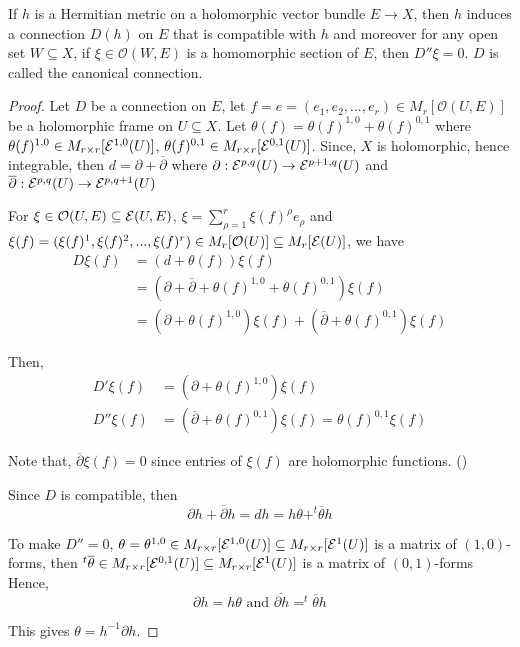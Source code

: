 \begin{theorem}
	If $h$ is a Hermitian metric on a holomorphic vector bundle $E \to X$, then $h$ induces a connection $D(h)$ on $E$ that is compatible with $h$ and moreover for any open set $W \subseteq X$, if $\xi \in \mathcal{O}(W, E)$ is a homomorphic section of $E$, then $D'' \xi = 0$. $D$ is called the canonical connection.
	\begin{proof}
		Let $D$ be a connection on $E$, let $f = e = (e_1, e_2, ..., e_r) \in M_{r}[\mathcal{O}(U, E)]$ be a holomorphic frame on $U \subseteq X$. Let $\theta(f) = \theta(f)^{1,0} +  \theta(f)^{0, 1}$ where $\theta(f)^{1,0} \in M_{r \times r}[\mathcal{E}^{1, 0}(U)]$, $\theta(f)^{0,1} \in M_{r \times r}[\mathcal{E}^{0,1}(U)]$. Since, $X$ is holomorphic, hence integrable, then $d = \partial + \overline{\partial}$ where $\partial: \mathcal{E}^{p, q}(U) \to \mathcal{E}^{p+1, q}(U)$ and  $\overline{\partial}: \mathcal{E}^{p, q}(U) \to \mathcal{E}^{p, q+1}(U)$
		
		 For $\xi \in \mathcal{O}(U, E) \subseteq \mathcal{E}(U, E)$, $\xi = \sum_{\rho=1}^r \xi(f)^\rho e_\rho$ and $\xi(f) = (\xi(f)^1, \xi(f)^2, ..., \xi(f)^r) \in M_r[\mathcal{O}(U)] \subseteq M_r[\mathcal{E}(U)]$, we have
		\begin{align*}
			D \xi(f)
			&= (d + \theta(f)) \xi(f) \\
			&= (\partial + \overline{\partial} + \theta(f)^{1,0} +  \theta(f)^{0, 1}) \xi(f) \\
			&= (\partial + \theta(f)^{1,0}) \xi(f) + (\overline{\partial} + \theta(f)^{0, 1}) \xi(f)
		\end{align*}
		
		Then, 
		\begin{align*}
			D' \xi(f) &= (\partial + \theta(f)^{1,0}) \xi(f) \\
			D'' \xi(f) &= (\overline{\partial} + \theta(f)^{0, 1}) \xi(f) = \theta(f)^{0, 1} \xi(f)
		\end{align*}
		
		Note that, $\overline{\partial} \xi(f) = 0$ since entries of $\xi(f)$ are holomorphic functions. () 
		
		Since $D$ is compatible, then
		$$
			\partial h + \overline{\partial} h = dh = h\theta + ^t\overline{\theta} h
		$$
		
		To make $D'' = 0$, $\theta = \theta^{1, 0} \in M_{r \times r}[\mathcal{E}^{1, 0}(U)] \subseteq M_{r \times r}[\mathcal{E}^1(U)]$ is a matrix of $(1, 0)$-forms, then $^t\overline{\theta} \in M_{r \times r}[\mathcal{E}^{0, 1}(U)] \subseteq M_{r \times r}[\mathcal{E}^1(U)]$ is a matrix of $(0, 1)$-forms
		Hence,
		$$
			\partial h = h \theta \text{ and } \overline{\partial h} = ^t\overline{\theta} h
		$$
		
		This gives $\theta = h^{-1} \partial h$.
	\end{proof}
\end{theorem}

